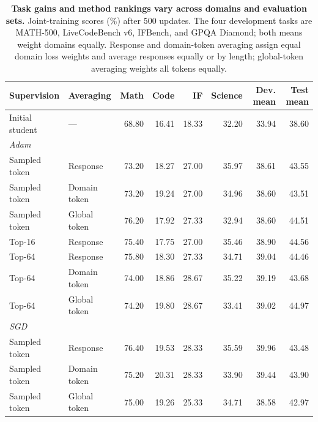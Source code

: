 \begin{table}[t]
\centering\small
\setlength{\tabcolsep}{4pt}
\caption{\textbf{Task gains and method rankings vary across domains and evaluation sets.} Joint-training scores (\%) after 500 updates. The four development tasks are MATH-500, LiveCodeBench v6, IFBench, and GPQA Diamond; both means weight domains equally. Response and domain-token averaging assign equal domain loss weights and average responses equally or by length; global-token averaging weights all tokens equally.}
\label{tab:main_outcomes}
\begin{tabular}{llrrrrrr}
\toprule
Supervision & Averaging & Math & Code & IF & Science & Dev. mean & Test mean \\
\midrule
Initial student & --- & 68.80 & 16.41 & 18.33 & 32.20 & 33.94 & 38.60 \\
\midrule
\multicolumn{8}{l}{\textit{Adam}} \\
Sampled token & Response & 73.20 & 18.27 & 27.00 & 35.97 & 38.61 & 43.55 \\
Sampled token & Domain token & 73.20 & 19.24 & 27.00 & 34.96 & 38.60 & 43.51 \\
Sampled token & Global token & 76.20 & 17.92 & 27.33 & 32.94 & 38.60 & 44.51 \\
Top-16 & Response & 75.40 & 17.75 & 27.00 & 35.46 & 38.90 & 44.56 \\
Top-64 & Response & 75.80 & 18.30 & 27.33 & 34.71 & 39.04 & 44.46 \\
Top-64 & Domain token & 74.00 & 18.86 & 28.67 & 35.22 & 39.19 & 43.68 \\
Top-64 & Global token & 74.20 & 19.80 & 28.67 & 33.41 & 39.02 & 44.97 \\
\midrule
\multicolumn{8}{l}{\textit{SGD}} \\
Sampled token & Response & 76.40 & 19.53 & 28.33 & 35.59 & 39.96 & 43.48 \\
Sampled token & Domain token & 75.20 & 20.31 & 28.33 & 33.90 & 39.44 & 43.90 \\
Sampled token & Global token & 75.00 & 19.26 & 25.33 & 34.71 & 38.58 & 42.97 \\
\bottomrule
\end{tabular}
\end{table}
